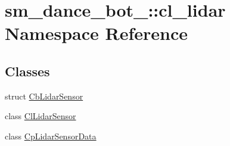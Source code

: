 \hypertarget{namespacesm__dance__bot__3_1_1cl__lidar}{}\section{sm\+\_\+dance\+\_\+bot\+\_\+:\+:cl\+\_\+lidar Namespace Reference}
\label{namespacesm__dance__bot__3_1_1cl__lidar}
\subsection*{Classes}
\begin{DoxyCompactItemize}
\item 
struct \hyperlink{structsm__dance__bot__3_1_1cl__lidar_1_1CbLidarSensor}{Cb\+Lidar\+Sensor}
\item 
class \hyperlink{classsm__dance__bot__3_1_1cl__lidar_1_1ClLidarSensor}{Cl\+Lidar\+Sensor}
\item 
class \hyperlink{classsm__dance__bot__3_1_1cl__lidar_1_1CpLidarSensorData}{Cp\+Lidar\+Sensor\+Data}
\end{DoxyCompactItemize}
